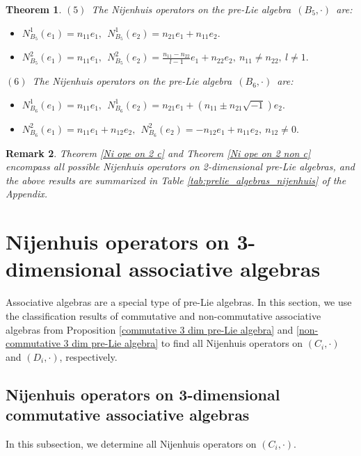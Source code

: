 \documentclass[12pt, reqno]{amsart}
\theoremstyle{plain}
\newtheorem{theorem}{Theorem}[section]
\newtheorem{remark}[theorem]{Remark}
\begin{document}
\begin{theorem}
$(5)$~The Nijenhuis operators on the pre-Lie algebra~$(B_{5},\cdot)$~are:
\begin{itemize}
   \item[]  $N_{B_{5}}^1(e_1)=n_{11}e_1 ,~~ N_{B_{5}}^1(e_2)= n_{21}e_1+ n_{11}e_2.$
   \end{itemize}
   \begin{itemize}
   \item[]  $N_{B_{5}}^2(e_1)=n_{11}e_1 ,~~ N_{B_{5}}^2(e_2)= \frac{n_{11}-n_{22}}{l-1}e_1+ n_{22}e_2,~n_{11}\neq n_{22},~l\neq1.$
   \end{itemize}

$(6)$~The Nijenhuis operators on the pre-Lie algebra~$(B_{6},\cdot)$~are:
\begin{itemize}
   \item[]  $N_{B_{6}}^1(e_1)=n_{11}e_1 ,~~ N_{B_{6}}^1(e_2)= n_{21}e_1+ (n_{11}\pm n_{21}\sqrt {-1})e_2.$
   \end{itemize}
\begin{itemize}
   \item[]  $N_{B_{6}}^2(e_1)=n_{11}e_1+n_{12}e_2 ,~~ N_{B_{6}}^2(e_2)= -n_{12}e_1+n_{11}e_2,~n_{12}\neq0.$
   \end{itemize}
\end{theorem}

\begin{remark}
Theorem \ref{Ni ope on 2 c} and Theorem \ref{Ni ope on 2 non c} encompass all possible Nijenhuis operators on 2-dimensional pre-Lie algebras, and the above results are summarized in Table \ref{tab:prelie_algebras_nijenhuis} of the Appendix. 
\end{remark}


\section{Nijenhuis operators on 3-dimensional associative algebras}

Associative algebras are a special type of pre-Lie algebras. In this section, we use the classification results of commutative and non-commutative associative algebras from Proposition \ref{commutative 3 dim pre-Lie algebra} and \ref{non-commutative 3 dim pre-Lie algebra} to find all Nijenhuis operators on $(C_{i},\cdot)$ and $(D_{i},\cdot)$, respectively.


\subsection{Nijenhuis operators on 3-dimensional commutative associative algebras}
In this subsection, we determine all Nijenhuis operators on $(C_i,\cdot)$.
\end{document}
